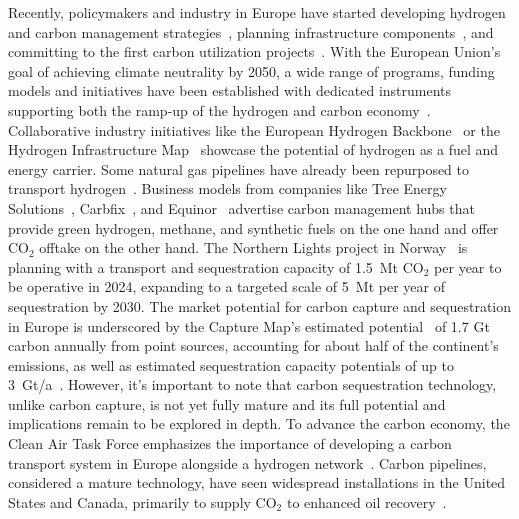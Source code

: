\documentclass[twocolumn]{article}
\newcommand{\COtwo}{CO$_2$}
\newcommand{\carbon}{CO$_2$}
\begin{document}
Recently, policymakers and industry in Europe have started developing hydrogen and carbon management strategies~\cite{GermanyDevelopingStrategy2023,CarbonManagementStrategie}, planning infrastructure components~\cite{CONetz}, and committing to the first carbon utilization projects~\cite{EFuelsPilotPlant2022,OrstedAssumesFull,GROUNDBREAKINGEFUELPRODUCTION,DLREfuelsDLR}. With the European Union's goal of achieving climate neutrality by 2050, a wide range of programs, funding models and initiatives have been established with dedicated instruments supporting both the ramp-up of the hydrogen and carbon economy~\cite{eu2023netzero,europeangreendeal,europeaninnovationfund}.
Collaborative industry initiatives like the European Hydrogen Backbone~\cite{gasforclimateEuropeanHydrogenBackbone2022} or the Hydrogen Infrastructure Map~\cite{H2InfrastructureMap} showcase the potential of hydrogen as a fuel and energy carrier. Some natural gas pipelines have already been repurposed to transport hydrogen~\cite{RohrFreiFuer}. Business models from companies like Tree Energy Solutions~\cite{TESHydrogenLife2023}, Carbfix~\cite{WeTurnCO2}, and Equinor~\cite{adomaitisEquinorRWEBuild2023} advertise carbon management hubs that provide green hydrogen, methane, and synthetic fuels on the one hand and offer \COtwo{} offtake on the other hand. The Northern Lights project in Norway~\cite{NorthernLightsWhat} is planning with a transport and sequestration capacity of 1.5~Mt \COtwo{} per year to be operative in 2024, expanding to a targeted scale of 5~Mt per year of sequestration by 2030.
The market potential for carbon capture and sequestration in Europe is underscored by the Capture Map's estimated potential~\cite{ToolsGreenTransition} of 1.7 Gt carbon annually from point sources, accounting for about half of the continent's emissions, as well as estimated sequestration capacity potentials of up to 3~Gt/a~\cite{europeancommissionEuropeanCO2Storage}. However, it's important to note that carbon sequestration technology, unlike carbon capture, is not yet fully mature and its full potential and implications remain to be explored in depth.
To advance the carbon economy, the Clean Air Task Force emphasizes the importance of developing a carbon transport system in Europe alongside a hydrogen network~\cite{lockwoodEuropeanStrategyCarbon}. Carbon pipelines, considered a mature technology, have seen widespread installations in the United States and Canada, primarily to supply \carbon{} to enhanced oil recovery~\cite{righettiSitingCarbonDioxide2017,friedmannNETZEROGEOSPHERICRETURN}.
\end{document}

